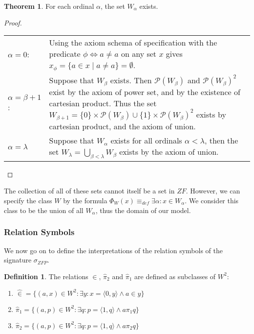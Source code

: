 \documentclass[11pt]{report}
\newcommand{\eqdef}{\equiv_\mathit{def}}
\newcommand{\pleft}{\mathrel{\pi_1}}
\newcommand{\pright}{\mathrel{\pi_2}}
\newcommand{\pair}[2]{\langle #1,#2 \rangle}
\newcommand{\zin}{\mathrel{\widehat{\in}}}
\newcommand{\zpright}{\mathrel{\widehat{\pi}_2}}
\newcommand{\zpleft}{\mathrel{\widehat{\pi}_1}}
\theoremstyle{definition}
\theoremstyle{theorem}
\theoremstyle{lemma}
\newtheorem{definition}{Definition}[section]
\newtheorem{theorem}{Theorem}[section]
\begin{document}
\begin{theorem} For each ordinal $\alpha$, the set $W_\alpha$ exists.
  \begin{proof} \hspace{1mm}\\
    \begin{tabular}{p{20mm} p{138mm}}
      $\alpha = 0$: \rule{0pt}{4ex} &
      Using the axiom schema of specification with the predicate $\phi \Leftrightarrow a \neq a$ on any set $x$ gives $x_\phi = \{a \in x \mid a \neq a \} = \emptyset$. \\
      $\alpha = \beta+1$: \rule{0pt}{4ex} &
      Suppose that $W_\beta$ exists. Then $\mathcal{P}(W_\beta)$ and $\mathcal{P}(W_\beta)^2$ exist by the axiom of power set, and by the existence of cartesian product. Thus the set $W_{\beta+1} = \{0\}\times\mathcal{P}(W_\beta) \cup \{1\}\times \mathcal{P}(W_\beta)^2$ exists by cartesian product, and the axiom of union. \\

      $\alpha = \lambda$ \rule{0pt}{4ex} &
      Suppose that $W_\alpha$ exists for all ordinals $\alpha<\lambda$, then the set $W_\lambda = \bigcup_{\beta < \lambda} W_\beta$ exists by the axiom of union.
    \end{tabular}
  \end{proof}
\end{theorem}
\noindent
The collection of all of these sets cannot itself be a set in $\mathit{ZF}$. However, we can specify the class $W$ by the formula $\Phi_W(x) \eqdef \exists \alpha: x\in W_\alpha$.
We consider this class to be the union of all $W_\alpha$, thus the domain of our model.

\subsubsection{Relation Symbols}
We now go on to define the interpretations of the relation symbols of the signature $\sigma_{\mathit{ZFP}}$.

\begin{definition} The relations $\zin$, $\zpright$ and $\zpleft$ are defined as subclasses of $W^2$:
  \begin{enumerate}[label=(\roman*)]
    \item $\zin = \{(a,x)\in W^2: \exists y: x = \pair{0}{y} \wedge a \in y\}$
    \item $\zpleft = \{(a,p)\in W^2 : \exists q: p = \pair{1}{q} \wedge a\pleft q\}$
    \item $\zpright = \{(a,p)\in W^2 : \exists q: p = \pair{1}{q} \wedge a\pright q\}$
  \end{enumerate}
\end{definition}
\end{document}
